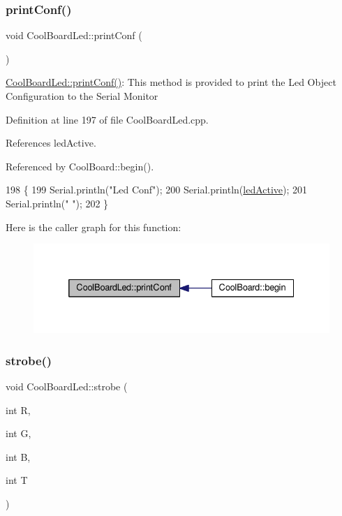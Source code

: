 \subsubsection{\texorpdfstring{print\+Conf()}{printConf()}}
{\footnotesize\ttfamily void Cool\+Board\+Led\+::print\+Conf (\begin{DoxyParamCaption}{ }\end{DoxyParamCaption})}

\hyperlink{classCoolBoardLed_a8ed3053a36f0ed4a131f43b5b17efb61}{Cool\+Board\+Led\+::print\+Conf()}\+: This method is provided to print the Led Object Configuration to the Serial Monitor 

Definition at line 197 of file Cool\+Board\+Led.\+cpp.



References led\+Active.



Referenced by Cool\+Board\+::begin().


\begin{DoxyCode}
198 \{
199     Serial.println(\textcolor{stringliteral}{"Led Conf"});
200     Serial.println(\hyperlink{classCoolBoardLed_a5f17c135516fcf4b44ea8a096ba0177a}{ledActive});
201     Serial.println(\textcolor{stringliteral}{" "});    
202 \}
\end{DoxyCode}
Here is the caller graph for this function\+:
\nopagebreak
\begin{figure}[H]
\begin{center}
\leavevmode
\includegraphics[width=332pt]{classCoolBoardLed_a8ed3053a36f0ed4a131f43b5b17efb61_icgraph}
\end{center}
\end{figure}
\mbox{\label{classCoolBoardLed_adc08c0ac07473499971c503d300f0413}} 
\subsubsection{\texorpdfstring{strobe()}{strobe()}}
{\footnotesize\ttfamily void Cool\+Board\+Led\+::strobe (\begin{DoxyParamCaption}\item[{int}]{R,  }\item[{int}]{G,  }\item[{int}]{B,  }\item[{int}]{T }\end{DoxyParamCaption})}

